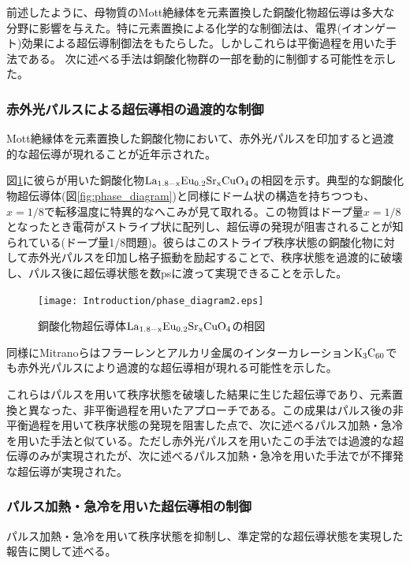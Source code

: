 前述したように、母物質のMott絶縁体を元素置換した銅酸化物超伝導は多大な分野に影響を与えた。特に元素置換による化学的な制御法は、電界(イオンゲート)効果による超伝導制御法をもたらした。しかしこれらは平衡過程を用いた手法である。
次に述べる手法は銅酸化物群の一部を動的に制御する可能性を示した。

\subsubsection{赤外光パルスによる超伝導相の過渡的な制御}
Mott絶縁体を元素置換した銅酸化物において、赤外光パルスを印加すると過渡的な超伝導が現れることが近年示された\cite{Fausti,Hunt2015}。

図\ref{fig:phase_diagram2}に彼らが用いた銅酸化物$\rm La_{1.8-x}Eu_{0.2}Sr_{x}CuO_4$の相図を示す\cite{Cavalleri2018}。典型的な銅酸化物超伝導体(図\ref{fig:phase_diagram})と同様にドーム状の構造を持ちつつも、$x=1/8$で転移温度に特異的なへこみが見て取れる。この物質はドープ量$x=1/8$となったとき電荷がストライプ状に配列し、超伝導の発現が阻害されることが知られている(ドープ量1/8問題)。彼らはこのストライプ秩序状態の銅酸化物に対して赤外光パルスを印加し格子振動を励起することで、秩序状態を過渡的に破壊し、パルス後に超伝導状態を数psに渡って実現できることを示した。
\begin{figure}[!h]
    \begin{center}
   \texttt{[image: Introduction/phase\_diagram2.eps]}
  \end{center}
  \caption{銅酸化物超伝導体$\rm La_{1.8-x}Eu_{0.2}Sr_{x}CuO_4$の相図\cite{Cavalleri2018}}
  \label{fig:phase_diagram2}
\end{figure}

同様にMitranoらはフラーレンとアルカリ金属のインターカレーション$\rm K_3C_{60}$でも赤外光パルスにより過渡的な超伝導相が現れる可能性を示した\cite{Mitrano2016}。

これらはパルスを用いて秩序状態を破壊した結果に生じた超伝導であり、元素置換と異なった、非平衡過程を用いたアプローチである。この成果はパルス後の非平衡過程を用いて秩序状態の発現を阻害した点で、次に述べるパルス加熱・急冷を用いた手法と似ている。ただし赤外光パルスを用いたこの手法では過渡的な超伝導のみが実現されたが、次に述べるパルス加熱・急冷を用いた手法でが不揮発な超伝導が実現された。

\subsubsection{パルス加熱・急冷を用いた超伝導相の制御}
パルス加熱・急冷を用いて秩序状態を抑制し、準定常的な超伝導状態を実現した報告に関して述べる。

